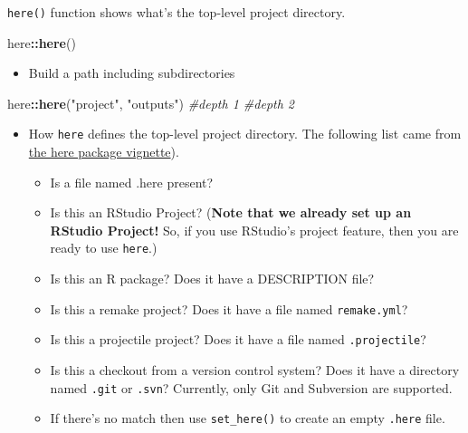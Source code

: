 \documentclass[
]{book}
\newenvironment{Shaded}{\begin{snugshade}}{\end{snugshade}}
\newcommand{\CommentTok}[1]{\textcolor[rgb]{0.56,0.35,0.01}{\textit{#1}}}
\newcommand{\KeywordTok}[1]{\textcolor[rgb]{0.13,0.29,0.53}{\textbf{#1}}}
\newcommand{\NormalTok}[1]{#1}
\newcommand{\OperatorTok}[1]{\textcolor[rgb]{0.81,0.36,0.00}{\textbf{#1}}}
\newcommand{\StringTok}[1]{\textcolor[rgb]{0.31,0.60,0.02}{#1}}
\providecommand{\tightlist}{%
  \setlength{\itemsep}{0pt}\setlength{\parskip}{0pt}}
\begin{document}
\texttt{here()} function shows what's the top-level project directory.

\begin{Shaded}
\begin{Highlighting}[]
\NormalTok{here}\OperatorTok{::}\KeywordTok{here}\NormalTok{()}
\end{Highlighting}
\end{Shaded}

\begin{itemize}
\tightlist
\item
  Build a path including subdirectories
\end{itemize}

\begin{Shaded}
\begin{Highlighting}[]
\NormalTok{here}\OperatorTok{::}\KeywordTok{here}\NormalTok{(}\StringTok{"project"}\NormalTok{, }\StringTok{"outputs"}\NormalTok{)}
           \CommentTok{\#depth 1   \#depth 2}
\end{Highlighting}
\end{Shaded}

\begin{itemize}
\item
  How \texttt{here} defines the top-level project directory. The following list came from \href{https://github.com/jennybc/here_here}{the here package vignette}).

  \begin{itemize}
  \item
    Is a file named .here present?
  \item
    Is this an RStudio Project? (\textbf{Note that we already set up an RStudio Project!} So, if you use RStudio's project feature, then you are ready to use \texttt{here}.)
  \item
    Is this an R package? Does it have a DESCRIPTION file?
  \item
    Is this a remake project? Does it have a file named \texttt{remake.yml}?
  \item
    Is this a projectile project? Does it have a file named \texttt{.projectile}?
  \item
    Is this a checkout from a version control system? Does it have a directory named \texttt{.git} or \texttt{.svn}? Currently, only Git and Subversion are supported.
  \item
    If there's no match then use \texttt{set\_here()} to create an empty \texttt{.here} file.
  \end{itemize}
\end{itemize}
\end{document}
